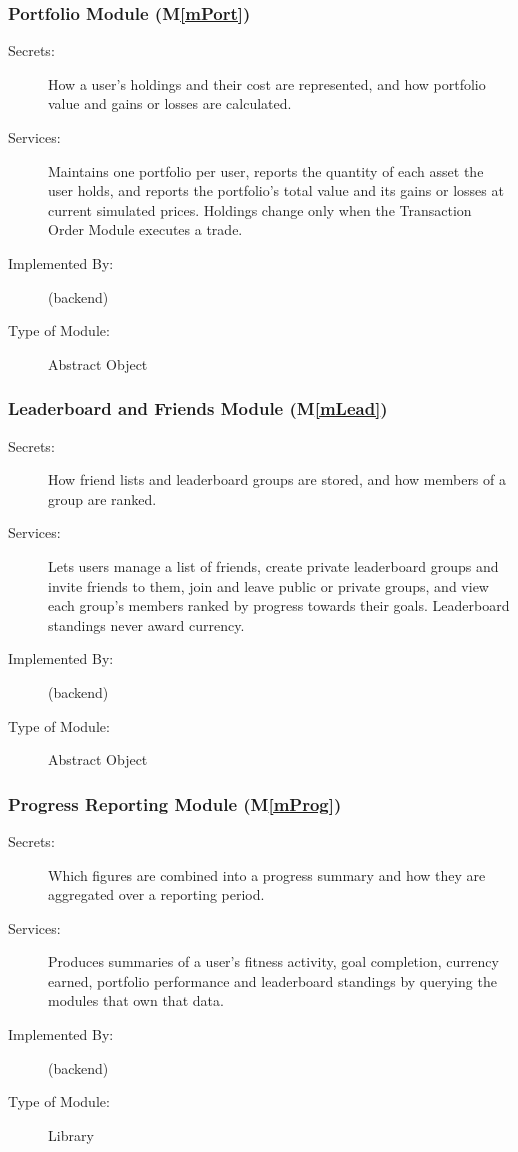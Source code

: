 \documentclass[12pt, titlepage]{article}
\newcommand{\mref}[1]{M\ref{#1}}
\begin{document}
\subsubsection{Portfolio Module (\mref{mPort})}

\begin{description}
\item[Secrets:] How a user's holdings and their cost are represented, and how
  portfolio value and gains or losses are calculated.
\item[Services:] Maintains one portfolio per user, reports the quantity of each
  asset the user holds, and reports the portfolio's total value and its gains
  or losses at current simulated prices. Holdings change only when the
  Transaction Order Module executes a trade.
\item[Implemented By:] \progname{} (backend)
\item[Type of Module:] Abstract Object
\end{description}

\subsubsection{Leaderboard and Friends Module (\mref{mLead})}

\begin{description}
\item[Secrets:] How friend lists and leaderboard groups are stored, and how
  members of a group are ranked.
\item[Services:] Lets users manage a list of friends, create private
  leaderboard groups and invite friends to them, join and leave public or
  private groups, and view each group's members ranked by progress towards
  their goals. Leaderboard standings never award currency.
\item[Implemented By:] \progname{} (backend)
\item[Type of Module:] Abstract Object
\end{description}

\subsubsection{Progress Reporting Module (\mref{mProg})}

\begin{description}
\item[Secrets:] Which figures are combined into a progress summary and how they
  are aggregated over a reporting period.
\item[Services:] Produces summaries of a user's fitness activity, goal
  completion, currency earned, portfolio performance and leaderboard standings
  by querying the modules that own that data.
\item[Implemented By:] \progname{} (backend)
\item[Type of Module:] Library
\end{description}
\end{document}

